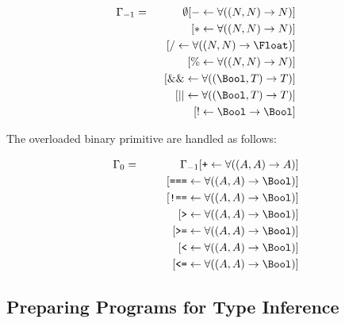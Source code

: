 \begin{eqnarray*}
  \Gamma_{-1} & = &
       \emptyset[ - \leftarrow \forall((N, N) \rightarrow N)]\\
&& \hspace{2mm} [ * \leftarrow \forall((N, N) \rightarrow N)]\\
&& \hspace{2mm} [ / \leftarrow \forall((N, N) \rightarrow \Float)]\\
&& \hspace{2mm} [ \% \leftarrow \forall((N, N) \rightarrow N)]\\
&& \hspace{2mm} [ \&\& \leftarrow \forall((\Bool, T) \rightarrow T)]\\
&& \hspace{2mm} [ || \leftarrow \forall((\Bool, T) \rightarrow T)]\\
&& \hspace{2mm} [ ! \leftarrow \Bool \rightarrow \Bool]\\
\end{eqnarray*}

The overloaded binary primitive are handled as follows:

\begin{eqnarray*}
\Gamma_{0} & = &
\Gamma_{-1}
                 [ \texttt{+} \leftarrow \forall((A, A) \rightarrow A)] \\
&& \hspace{6mm}  [ \texttt{===} \leftarrow \forall((A, A) \rightarrow \Bool)] \\
&& \hspace{6mm}  [ \texttt{!==} \leftarrow \forall((A, A) \rightarrow \Bool)] \\
&& \hspace{6mm}  [ \texttt{>} \leftarrow \forall((A, A) \rightarrow \Bool)]\\
&& \hspace{6mm}  [ \texttt{>=} \leftarrow \forall((A, A) \rightarrow \Bool)]\\
&& \hspace{6mm}  [ \texttt{<} \leftarrow \forall((A, A) \rightarrow \Bool)] \\
&& \hspace{6mm}  [ \texttt{<=} \leftarrow \forall((A, A) \rightarrow \Bool)]
\end{eqnarray*}



\subsection{Preparing Programs for Type Inference}


